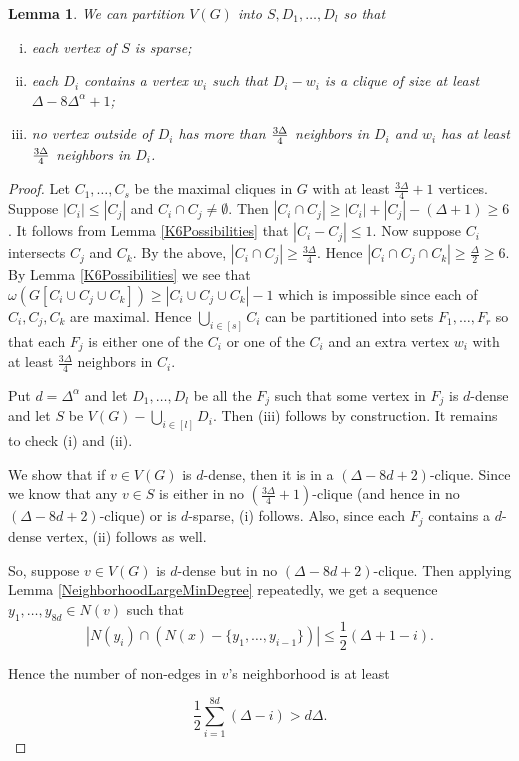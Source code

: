\documentclass[12pt]{article}
\newtheorem{lemma}[theorem]{Lemma}
\theoremstyle{definition}
\begin{document}
\begin{lemma}\label{decomp}
We can partition $V(G)$ into $S, D_1, \ldots, D_l$ so that
\begin{enumerate}[(i)]
\item each vertex of $S$ is sparse;
\item each $D_i$ contains a vertex $w_i$ such that $D_i-w_i$ is a clique of size at least $\Delta-8\Delta^{\alpha}+1$;
\item no vertex outside of $D_i$ has more than ${3\Delta\over 4}$ neighbors in $D_i$ and $w_i$ has at least ${3\Delta\over 4}$ neighbors in $D_i$.
\end{enumerate}
\end{lemma}
\begin{proof}
Let $C_1, \ldots, C_s$ be the maximal cliques in $G$ with at least $\frac{3\Delta}{4} + 1$ vertices.  Suppose $|C_i| \leq |C_j|$ and $C_i \cap C_j \neq \emptyset$. 
Then $|C_i \cap C_j| \geq |C_i| + |C_j| - (\Delta + 1) \geq 6$.  It follows from Lemma
\ref{K6Possibilities} that $|C_i - C_j| \leq 1$.  Now suppose $C_i$ intersects $C_j$ and $C_k$.  By the above,
$|C_i \cap C_j| \geq \frac{3\Delta}{4}$.  Hence $|C_i \cap C_j \cap C_k| \geq \frac{\Delta}{2} \geq 6$.  By Lemma \ref{K6Possibilities} we see that $\omega(G[C_i \cup C_j \cup C_k]) \geq |C_i \cup C_j \cup C_k| - 1$ which is impossible since each of $C_i, C_j, C_k$ are maximal.  Hence $\bigcup_{i \in [s]} C_i$ can be
partitioned into sets $F_1, \ldots, F_r$ so that each $F_j$ is either one of the $C_i$ or one of the $C_i$ and an extra vertex $w_i$ with at least $\frac{3\Delta}{4}$ neighbors in $C_i$.

Put $d = \Delta^{\alpha}$ and let $D_1, \ldots, D_l$ be all the $F_j$ such that some vertex in $F_j$ is $d$-dense and let $S$ be $V(G) - \bigcup_{i \in [l]} D_i$.  Then (iii) follows by construction.  It remains to check (i) and (ii).

We show that if $v \in V(G)$ is $d$-dense, then it is in a $(\Delta - 8d + 2)$-clique. Since we know that any $v \in S$ is either in no $(\frac{3\Delta}{4} + 1)$-clique (and hence in no $(\Delta - 8d + 2)$-clique) or is $d$-sparse, (i) follows. Also, since each $F_j$ contains a $d$-dense vertex, (ii) follows as well.

So, suppose $v \in V(G)$ is $d$-dense but in no $(\Delta - 8d + 2)$-clique. Then applying Lemma \ref{NeighborhoodLargeMinDegree} repeatedly, we get a sequence $y_1, \ldots, y_{8d} \in N(v)$ such that 
\[|N(y_i) \cap (N(x) - \{y_1, \ldots, y_{i-1}\})| \leq \frac12 (\Delta + 1 - i).\]

Hence the number of non-edges in $v$'s neighborhood is at least 

\[\frac12\sum_{i=1}^{8d} (\Delta - i) > d\Delta.\]
\end{proof}
\end{document}
